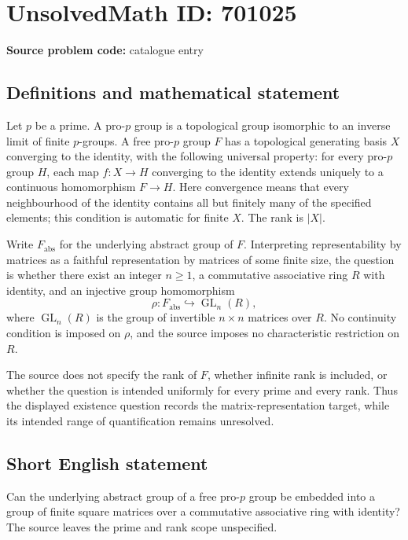 \documentclass[11pt]{article}
\begin{document}
\section*{UnsolvedMath ID: 701025}
\textbf{Source problem code:} catalogue entry
\subsection{Definitions and mathematical statement}
Let \(p\) be a prime. A pro-\(p\) group is a topological group isomorphic to an inverse limit of finite \(p\)-groups. A free pro-\(p\) group \(F\) has a topological generating basis \(X\) converging to the identity, with the following universal property: for every pro-\(p\) group \(H\), each map \(f:X\to H\) converging to the identity extends uniquely to a continuous homomorphism \(F\to H\). Here convergence means that every neighbourhood of the identity contains all but finitely many of the specified elements; this condition is automatic for finite \(X\). The rank is \(|X|\).

Write \(F_{\mathrm{abs}}\) for the underlying abstract group of \(F\). Interpreting representability by matrices as a faithful representation by matrices of some finite size, the question is whether there exist an integer \(n\geq 1\), a commutative associative ring \(R\) with identity, and an injective group homomorphism
\[
\rho:F_{\mathrm{abs}}\hookrightarrow \operatorname{GL}_n(R),
\]
where \(\operatorname{GL}_n(R)\) is the group of invertible \(n\times n\) matrices over \(R\). No continuity condition is imposed on \(\rho\), and the source imposes no characteristic restriction on \(R\).

The source does not specify the rank of \(F\), whether infinite rank is included, or whether the question is intended uniformly for every prime and every rank. Thus the displayed existence question records the matrix-representation target, while its intended range of quantification remains unresolved.
\subsection{Short English statement}
Can the underlying abstract group of a free pro-\(p\) group be embedded into a group of finite square matrices over a commutative associative ring with identity? The source leaves the prime and rank scope unspecified.
\end{document}
